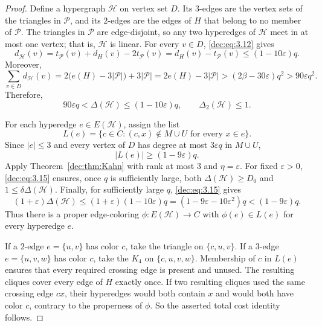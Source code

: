 \documentclass[11pt]{article}
\numberwithin{equation}{section}
\theoremstyle{remark}
\newcommand{\e}{\varepsilon}
\begin{document}
\begin{proof}
Define a hypergraph \(\mathcal H\) on vertex set \(D\).  Its \(3\)-edges
are the vertex sets of the triangles in \(\mathcal P\), and its \(2\)-edges
are the edges of \(H\) that belong to no member of \(\mathcal P\).  The
triangles in \(\mathcal P\) are edge-disjoint, so any two hyperedges of
\(\mathcal H\) meet in at most one vertex; that is, \(\mathcal H\) is
linear.  For every \(v\in D\), \eqref{dec:eq:3.12} gives
\begin{equation*}
 d_{\mathcal H}(v)
 =t_{\mathcal P}(v)+d_H(v)-2t_{\mathcal P}(v)
 =d_H(v)-t_{\mathcal P}(v)
 \le(1-10\e)q.
\end{equation*}
Moreover,
\begin{equation*}
 \sum_{v\in D}d_{\mathcal H}(v)
 =2\bigl(e(H)-3|\mathcal P|\bigr)+3|\mathcal P|
 =2e(H)-3|\mathcal P|
 >\left(2\beta-30\e\right)q^2
 >90\e q^2.
\end{equation*}
Therefore, 
\begin{equation}\label{dec:eq:3.15}
 90\e q<\Delta({\mathcal H})\le(1-10\e)q,
 \qquad \Delta_2(\mathcal H)\le1.
\end{equation}

For each hyperedge \(e\in E(\mathcal H)\), assign the list
\begin{equation*}
 L(e)=\{c\in C:(c,x)\notin M\cup U\text{ for every }x\in e\}.
\end{equation*}
Since \(|e|\le3\) and every vertex of \(D\) has degree at most
\(3\e q\) in \(M\cup U\),
\begin{equation*}
 |L(e)|\ge(1-9\e)q.
\end{equation*}
Apply Theorem~\ref{dec:thm:Kahn} with rank at most \(3\) and
\(\eta=\e\).  For fixed \(\e>0\), \eqref{dec:eq:3.15} ensures, once \(q\) is
sufficiently large, both \(\Delta({\mathcal H})\ge D_0\) and
\(1\le\delta \Delta({\mathcal H})\).  Finally, for sufficiently large \(q\), \eqref{dec:eq:3.15} gives
\begin{equation*}
 (1+\e)\Delta({\mathcal H})
 \le(1+\e)(1-10\e)q
 =(1-9\e-10\e^2)q
 <(1-9\e)q.
\end{equation*}
Thus there is a proper edge-coloring \(\phi:E(\mathcal H)\to C\) with \(\phi(e)\in L(e)\) for every hyperedge \(e\).

If a \(2\)-edge \(e=\{u,v\}\) has color \(c\), take the triangle on
\(\{c,u,v\}\).  If a \(3\)-edge \(e=\{u,v,w\}\) has color \(c\),
take the \(K_4\) on \(\{c,u,v,w\}\).  Membership of \(c\) in \(L(e)\) ensures that every
required crossing edge is present and unused. The resulting cliques cover every edge of
\(H\) exactly once. If two resulting cliques used
the same crossing edge \(cx\), their hyperedges would both contain \(x\) and
would both have color \(c\), contrary to the properness of \(\phi\). So the asserted total cost identity follows.

\end{proof}
\end{document}
